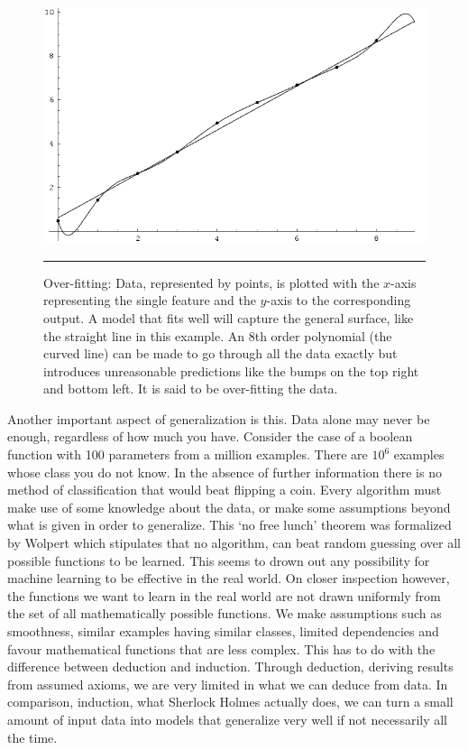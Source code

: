 \begin{figure}[htbp]
	\centering
		\includegraphics{./Figures/overfit.png}
		\rule{35em}{0.5pt}
	\caption[Over-fitting]{Over-fitting: Data, represented by points, is plotted with the $x$-axis representing the single feature and the $y$-axis to the corresponding output. A model that fits well will capture the general surface, like the straight line in this example. An 8th order polynomial (the curved line) can be made to go through all the data exactly but introduces unreasonable predictions like the bumps on the top right and bottom left. It is said to be over-fitting the data. }
	\label{fig:over-fitting}
\end{figure}

Another important aspect of generalization is this.
Data alone may never be enough, regardless of how much you have\citep{domingos2012few}.
Consider the case of a boolean function with 100 parameters from a million examples.
There are $10^6$ examples whose class you do not know.
In the absence of further information there is no method of classification that would beat flipping a coin.
Every algorithm must make use of some knowledge about the data, or make some assumptions beyond what is given in order to generalize.
This `no free lunch' theorem was formalized by Wolpert which stipulates that no algorithm, can beat random guessing over all possible functions to be learned\citep{Wolpert96thelack}.
This seems to drown out any possibility for machine learning to be effective in the real world.
On closer inspection however, the functions we want to learn in the real world are not drawn uniformly from the set of all mathematically possible functions.
We make assumptions such as smoothness, similar examples having similar classes, limited dependencies and favour mathematical functions that are less complex.
This has to do with the difference between deduction and induction.
Through deduction, deriving results from assumed axioms, we are very limited in what we can deduce from data.
In comparison, induction, what Sherlock Holmes actually does, we can turn a small amount of input data into models that generalize very well if not necessarily all the time.
